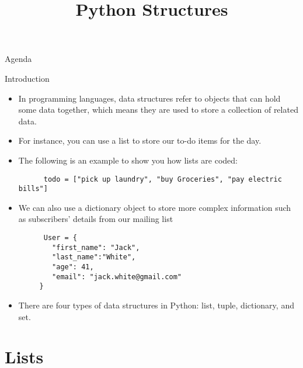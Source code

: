 \documentclass[../main.tex]{subfiles}
\title{Python Structures}
\begin{document}
\begin{frame}
  \maketitle
\end{frame}
\begin{frame}{Agenda}
  \tableofcontents
\end{frame}
\begin{frame}[fragile]{Introduction}
  \begin{itemize} \justifying
  \item   In programming languages, data structures refer to objects that can hold some data together, which means they are used to store a collection of related data.
  \item For instance, you can use a list to store our to-do items for the day. 
  \item The following is an example to show you how lists are coded:
    \begin{lstlisting}
      todo = ["pick up laundry", "buy Groceries", "pay electric bills"]
    \end{lstlisting}
  \item We can also use a dictionary object to store more complex information such as subscribers' details from our mailing list
    \begin{lstlisting}
      User = {
        "first_name": "Jack",
        "last_name":"White",
        "age": 41,
        "email": "jack.white@gmail.com"
     }
    \end{lstlisting}
  \item There are four types of data structures in Python: \alert{list}, \alert{tuple}, \alert{dictionary}, and \alert{set}.
  \end{itemize}
\end{frame}

\section{Lists}
\label{sec:lists}
\end{document}
